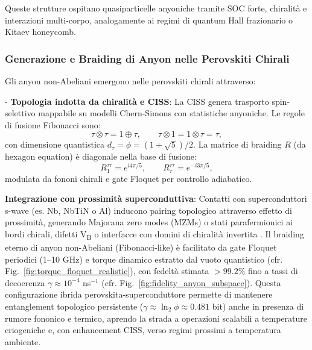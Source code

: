 \documentclass[11pt,a4paper]{article}
\let\oldcite\cite
\renewcommand{\cite}{\protect\oldcite}
\let\oldref\ref
\renewcommand{\ref}{\protect\oldref}
\theoremstyle{plain}
\theoremstyle{definition}
\begin{document}
Queste strutture ospitano quasiparticelle anyoniche tramite SOC forte, chiralità e interazioni multi-corpo, analogamente ai regimi di quantum Hall frazionario o Kitaev honeycomb.

\vspace{0.4cm}

\subsubsection{Generazione e Braiding di Anyon nelle Perovskiti Chirali}

Gli anyon non-Abeliani emergono nelle perovskiti chirali attraverso:

- \textbf{Topologia indotta da chiralità e CISS}: La CISS genera trasporto spin-selettivo mappabile su modelli Chern-Simons con statistiche anyoniche. Le regole di fusione Fibonacci sono:
  \begin{equation}
  \tau \otimes \tau = 1 \oplus \tau, \qquad \tau \otimes 1 = 1 \otimes \tau = \tau,
  \label{eq:fusion_fibonacci}
  \end{equation}
  con dimensione quantistica $d_\tau = \phi = (1 + \sqrt{5})/2$. La matrice di braiding $R$ (da hexagon equation) è diagonale nella base di fusione:
  \begin{equation}
  R^{\tau\tau}_1 = e^{i 4\pi / 5}, \qquad R^{\tau\tau}_\tau = e^{-i 3\pi / 5},
  \label{eq:braiding_matrix}
  \end{equation}
  modulata da fononi chirali e gate Floquet per controllo adiabatico.

  \vspace{0.4cm}

\textbf{Integrazione con prossimità superconduttiva}: Contatti con superconduttori s-wave (es. Nb, NbTiN o Al) inducono pairing topologico attraverso effetto di prossimità, generando Majorana zero modes (MZMs) o stati parafermionici ai bordi chirali, difetti V\textsubscript{B} o interfacce con domini di chiralità invertita \protect\cite{mourik2012signatures, jack2020majorana, phong2024mirror}. Il braiding eterno di anyon non-Abeliani (Fibonacci-like) è facilitato da gate Floquet periodici (1–10 GHz) e torque dinamico estratto dal vuoto quantistico (cfr. Fig.~\protect\ref{fig:torque_floquet_realistic}), con fedeltà stimata $>99.2\%$ fino a tassi di decoerenza $\gamma \approx 10^{-4}$ ns$^{-1}$ (cfr. Fig.~\protect\ref{fig:fidelity_anyon_subspace}). Questa configurazione ibrida perovskita-superconduttore permette di mantenere entanglement topologico persistente ($\gamma \approx \ln_2 \phi \approx 0.481$ bit) anche in presenza di rumore fononico e termico, aprendo la strada a operazioni scalabili a temperature criogeniche e, con enhancement CISS, verso regimi prossimi a temperatura ambiente.
\end{document}
